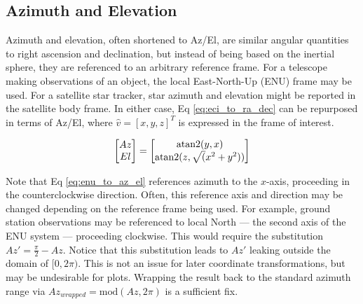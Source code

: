 \subsection{Azimuth and Elevation}

Azimuth and elevation, often shortened to Az/El, are similar angular quantities to right ascension and declination, but instead of being based on
the inertial sphere, they are referenced to an arbitrary reference frame. For a telescope making
observations of an object, the local East-North-Up (ENU) frame may be used. For a satellite star
tracker, star azimuth and elevation might be reported in the satellite body frame. In either case,
Eq \ref{eq:eci_to_ra_dec} can be repurposed in terms of Az/El, where $\hat{v} = \left[ x, y, z
\right]^T$ is expressed in the frame of interest.

\begin{equation} \label{eq:enu_to_az_el}
  \begin{bmatrix}
	Az \\
	El
  \end{bmatrix} = 
  \begin{bmatrix}
	\operatorname{atan2}(y, x) \\
	\operatorname{atan2}(z, \sqrt(x^2 + y^2))
  \end{bmatrix}
\end{equation}

Note that Eq \ref{eq:enu_to_az_el} references azimuth to the $x$-axis, proceeding in the
counterclockwise direction. Often, this reference axis and direction may be changed depending on the
reference frame being used. For example, ground station observations may be referenced to local
North ---  the second axis of the ENU system ---  proceeding clockwise. This would require the
substitution $Az' = \frac{\pi}{2} - Az$. Notice that this substitution leads to $Az'$ leaking
outside the domain of $[0, 2\pi)$. This is not an issue for later coordinate transformations, but
may be undesirable for plots. Wrapping the result back to the standard azimuth range via
$Az_{wrapped} = \textrm{mod}(Az, 2\pi)$ is a sufficient fix.